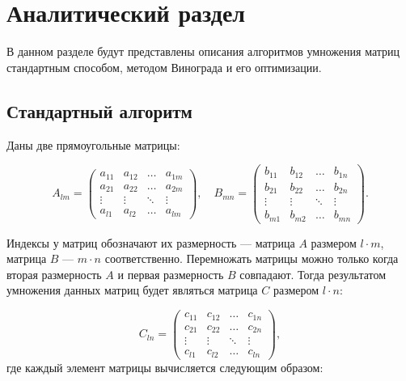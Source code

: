 \chapter{Аналитический раздел}

В данном разделе будут представлены описания алгоритмов умножения матриц стандартным способом, методом Винограда и его оптимизации.

\section{Стандартный алгоритм}

Даны две прямоугольные матрицы:

\begin{equation}
	A_{lm} = \begin{pmatrix}
		a_{11} & a_{12} & \ldots & a_{1m}\\
		a_{21} & a_{22} & \ldots & a_{2m}\\
		\vdots & \vdots & \ddots & \vdots\\
		a_{l1} & a_{l2} & \ldots & a_{lm}
	\end{pmatrix},
	\quad
	B_{mn} = \begin{pmatrix}
		b_{11} & b_{12} & \ldots & b_{1n}\\
		b_{21} & b_{22} & \ldots & b_{2n}\\
		\vdots & \vdots & \ddots & \vdots\\
		b_{m1} & b_{m2} & \ldots & b_{mn}
	\end{pmatrix}.
\end{equation}

Индексы у матриц обозначают их размерность --- матрица $A$ размером $l \cdot m$, матрица $B$ --- $m \cdot n$ соответственно. Перемножать матрицы можно только когда вторая размерность $A$ и первая размерность $B$ совпадают. Тогда результатом умножения данных матриц будет являться матрица $C$ размером $l \cdot n$:

\begin{equation}
	C_{ln} = \begin{pmatrix}
		c_{11} & c_{12} & \ldots & c_{1n}\\
		c_{21} & c_{22} & \ldots & c_{2n}\\
		\vdots & \vdots & \ddots & \vdots\\
		c_{l1} & c_{l2} & \ldots & c_{ln}
	\end{pmatrix},
\end{equation}
где каждый элемент матрицы вычисляется следующим образом:

